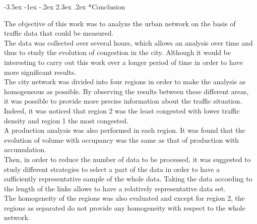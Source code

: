 \documentclass[a4paper, 12pt,oneside]{article}
\makeatletter
\renewcommand{\section}{\@startsection {section}{1}{\z@}%
             {-3.5ex \@plus -1ex \@minus -.2ex}%
             {2.3ex \@plus.2ex}%
             {\normalfont\normalsize\bfseries}}
\makeatother
\begin{document}
\newpage
\section*{Conclusion}

The objective of this work was to analyze the urban network on the basis of traffic data that could be measured.\\

The data was collected over several hours, which allows an analysis over time and thus to study the evolution of congestion in the city. Although it would be interesting to carry out this work over a longer period of time in order to have more significant results.\\

The city network was divided into four regions in order to make the analysis as homogeneous as possible. By observing the results between these different areas, it was possible to provide more precise information about the traffic situation. Indeed, it was noticed that region 2 was the least congested with lower traffic density and region 1 the most congested.\\

A production analysis was also performed in each region. It was found that the evolution of volume with occupancy was the same as that of production with accumulation.\\

Then, in order to reduce the number of data to be processed, it was suggested to study different strategies to select a part of the data in order to have a sufficiently representative sample of the whole data. Taking the data according to the length of the links allows to have a relatively representative data set.\\

The homogeneity of the regions was also evaluated and except for region 2, the regions as separated do not provide any homogeneity with respect to the whole network.
\end{document}
